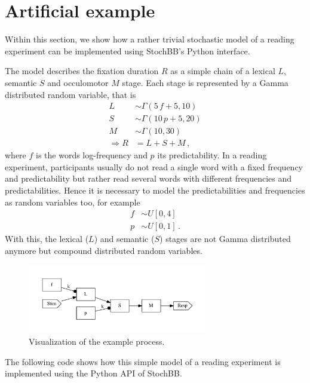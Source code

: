 \section{Artificial example} \label{sec:example}
Within this section, we show how a rather trivial stochastic model of a reading experiment can be
implemented using StochBB's Python interface.

The model describes the fixation duration $R$ as a simple chain of a lexical $L$, semantic $S$ and
occulomotor $M$ stage. Each stage is represented by a Gamma distributed random variable, that is
\begin{align*}
 L &\sim \Gamma(5\,f+5, 10)\\
 S &\sim \Gamma(10\,p+5, 20)\\
 M &\sim \Gamma(10, 30)\\
 \Rightarrow R &= L+S+M\,,
\end{align*} 
where $f$ is the words log-frequency and $p$ its predictability. In a reading experiment, 
participants usually do not read a single word with a fixed frequency and predictability but
rather read several words with different frequencies and predictabilities. Hence it is necessary
to model the predictabilities and frequencies as random variables too, for example
\begin{align*}
 f &\sim U[0,4]\\
 p &\sim U[0,1]\,.
\end{align*}
With this, the lexical ($L$) and semantic ($S$) stages are not Gamma distributed anymore but
compound distributed random variables. 

\begin{figure}[!ht]
 \centering
  \includegraphics[width=0.7\textwidth]{example_graph.pdf}
  \caption{Visualization of the example process.} \label{fig:exgraph}
\end{figure}

The following code shows how this simple model of a reading experiment is implemented using the
Python API of StochBB.

